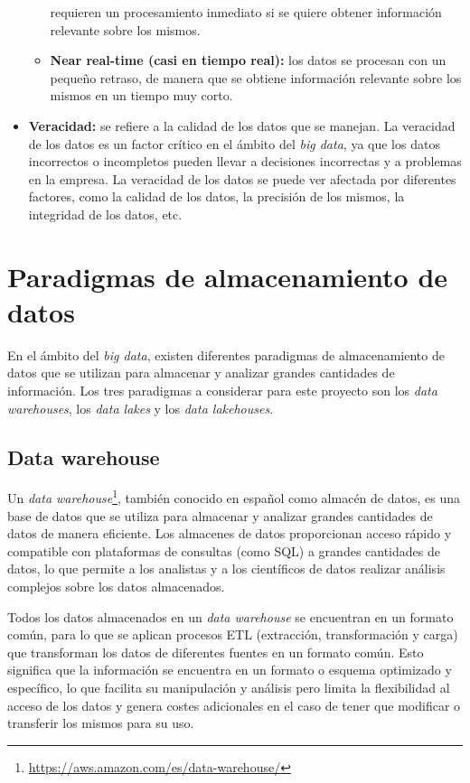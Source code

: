 \begin{itemize}
\begin{itemize}
				requieren un procesamiento inmediato si se quiere obtener
				información relevante sobre los mismos.
			\item \textbf{Near real-time (casi en tiempo real):} los datos se
				procesan con un pequeño retraso, de manera que se obtiene
				información relevante sobre los mismos en un tiempo muy corto.
		\end{itemize}
	\item \textbf{Veracidad:} se refiere a la calidad de los datos que se manejan.
		La veracidad de los datos es un factor crítico en el ámbito del \textit{big
		data}, ya que los datos incorrectos o incompletos pueden llevar a
		decisiones incorrectas y a problemas en la empresa. La veracidad de los
		datos se puede ver afectada por diferentes factores, como la calidad de
		los datos, la precisión de los mismos, la integridad de los datos, etc.
\end{itemize}


\newpage{}
\section{Paradigmas de almacenamiento de datos}\label{sec:paradigmas}
En el ámbito del \textit{big data}, existen diferentes paradigmas de
almacenamiento de datos que se utilizan para almacenar y analizar grandes
cantidades de información. Los tres paradigmas a considerar para este proyecto
son los \textit{data warehouses}, los \textit{data lakes} y los
\textit{data lakehouses}.


\subsection{Data warehouse}\label{sec:warehouse}
Un \textit{data warehouse}\footnote{
	\url{https://aws.amazon.com/es/data-warehouse/}
}, también conocido en español como almacén de datos, es una base de datos que
se utiliza para almacenar y analizar grandes cantidades de datos de manera
eficiente. Los almacenes de datos proporcionan acceso rápido y compatible con
plataformas de consultas (como SQL) a grandes cantidades de datos, lo que
permite a los analistas y a los científicos de datos realizar análisis complejos
sobre los datos almacenados.

Todos los datos almacenados en un \textit{data warehouse} se encuentran en un
formato común, para lo que se aplican procesos ETL (extracción, transformación y
carga) que transforman los datos de diferentes fuentes en un formato común. Esto
significa que la información se encuentra en un formato o esquema optimizado y
específico, lo que facilita su manipulación y análisis pero limita la
flexibilidad al acceso de los datos y genera costes adicionales en el caso de
tener que modificar o transferir los mismos para su uso.


